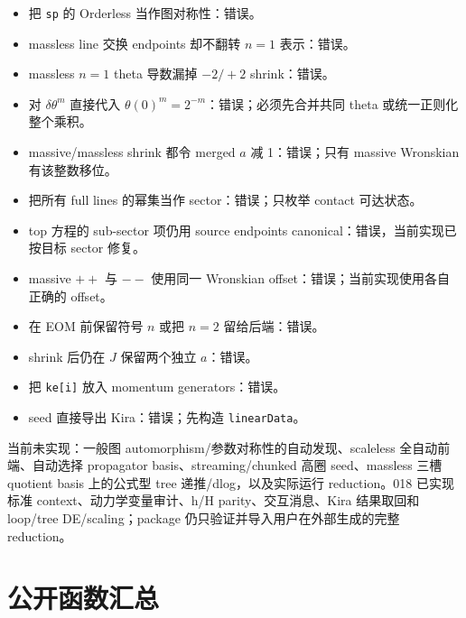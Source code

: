 ﻿\documentclass[a4paper,11pt]{article}
\begin{document}
\begin{itemize}
  \item 把 \texttt{sp} 的 Orderless 当作图对称性：错误。
  \item massless line 交换 endpoints 却不翻转 $n=1$ 表示：错误。
  \item massless $n=1$ theta 导数漏掉 $-2/+2$ shrink：错误。
  \item 对 $\delta\theta^m$ 直接代入 $\theta(0)^m=2^{-m}$：错误；必须先合并共同 theta 或统一正则化整个乘积。
  \item massive/massless shrink 都令 merged $a$ 减 1：错误；只有 massive Wronskian 有该整数移位。
  \item 把所有 full lines 的幂集当作 sector：错误；只枚举 contact 可达状态。
  \item top 方程的 sub-sector 项仍用 source endpoints canonical：错误，当前实现已按目标 sector 修复。
  \item massive $++$ 与 $--$ 使用同一 Wronskian offset：错误；当前实现使用各自正确的 offset。
  \item 在 EOM 前保留符号 $n$ 或把 $n=2$ 留给后端：错误。
  \item shrink 后仍在 $J$ 保留两个独立 $a$：错误。
  \item 把 \texttt{ke[i]} 放入 momentum generators：错误。
  \item seed 直接导出 Kira：错误；先构造 \texttt{linearData}。
\end{itemize}

当前未实现：一般图 automorphism/参数对称性的自动发现、scaleless 全自动前端、自动选择 propagator basis、streaming/chunked 高圈 seed、massless 三槽 quotient basis 上的公式型 tree 递推/dlog，以及实际运行 reduction。018 已实现标准 context、动力学变量审计、h/H parity、交互消息、Kira 结果取回和 loop/tree DE/scaling；package 仍只验证并导入用户在外部生成的完整 reduction。

\appendix
\section{公开函数汇总}
\end{document}
